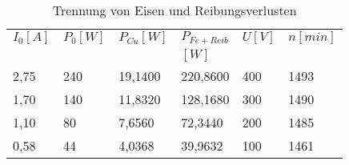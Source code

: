 \begin{table}[htbp]
    \centering
    \begin{tabularx}{\columnwidth}{XXXXXX}
        \toprule
        $I_0[A]$ &  $P_0[W]$ &  $P_{Cu}[W]$ &  $P_{Fe+Reib}$ &  $U[V]$ &  $n[min]$ \\
        & & & $[W]$& & \\
        \midrule
               2,75 &         240 &        19,1400 &            220,8600 &       400 &        1493 \\
               1,70 &         140 &        11,8320 &            128,1680 &       300 &        1490 \\
               1,10 &          80 &         7,6560 &             72,3440 &       200 &        1485 \\
               0,58 &          44 &         4,0368 &             39,9632 &       100 &        1461 \\
        \bottomrule
    \end{tabularx}
    \caption{Trennung von Eisen und Reibungsverlusten}
\end{table}
